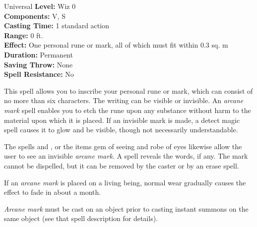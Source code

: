 {Universal}
{
	\textbf{Level:}
	Wiz 0\\
	\textbf{Components:}
	V, S\\
	\textbf{Casting Time:}
	1 standard action\\
	\textbf{Range:}
	0 ft.\\
	\textbf{Effect:}
	One personal rune or mark, all of which must fit within 0.3 sq. m\\
	\textbf{Duration:}
	Permanent\\
	\textbf{Saving Throw:}
	None\\
	\textbf{Spell Resistance:}
	No\\
}
{
	This spell allows you to inscribe your personal rune or mark, which can consist of no more than six characters. The writing can be visible or invisible. An \emph{arcane mark} spell enables you to etch the rune upon any substance without harm to the material upon which it is placed. If an invisible mark is made, a detect magic spell causes it to glow and be visible, though not necessarily understandable.

	The spells  and , or the items gem of seeing and robe of eyes likewise allow the user to see an invisible \emph{arcane mark}. A  spell reveals the words, if any. The mark cannot be dispelled, but it can be removed by the caster or by an erase spell.

	If an \emph{arcane mark} is placed on a living being, normal wear gradually causes the effect to fade in about a month.

	\emph{Arcane mark} must be cast on an object prior to casting instant summons on the same object (see that spell description for details).

}
